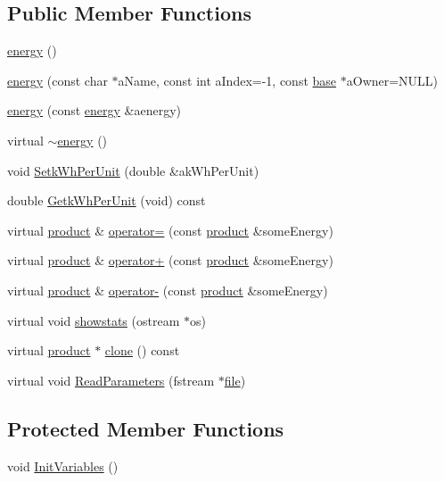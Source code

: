 \subsection*{Public Member Functions}
\begin{DoxyCompactItemize}
\item 
\hyperlink{classenergy_adb9b3923c92c41cba7ac1928d85ed713}{energy} ()
\item 
\hyperlink{classenergy_a86a3f0b749467778796dd2b68fe54b5c}{energy} (const char $\ast$aName, const int aIndex=-\/1, const \hyperlink{classbase}{base} $\ast$aOwner=NULL)
\item 
\hyperlink{classenergy_a2bc4d056b6f3f07f3f3fec1c6240d464}{energy} (const \hyperlink{classenergy}{energy} \&aenergy)
\item 
virtual \hyperlink{classenergy_a96e29d339fe11ddb48d8e17e0d52c0d3}{$\sim$energy} ()
\item 
void \hyperlink{classenergy_a9e9bf5c07d0b8455dcbbd45912533a12}{SetkWhPerUnit} (double \&akWhPerUnit)
\item 
double \hyperlink{classenergy_a61157b46f4f7115eb34238d944a33fe4}{GetkWhPerUnit} (void) const 
\item 
virtual \hyperlink{classproduct}{product} \& \hyperlink{classenergy_aaaba546a4978621479e3e26042463638}{operator=} (const \hyperlink{classproduct}{product} \&someEnergy)
\item 
virtual \hyperlink{classproduct}{product} \& \hyperlink{classenergy_acd0d43ec7777b3f63658b7b1f430e579}{operator+} (const \hyperlink{classproduct}{product} \&someEnergy)
\item 
virtual \hyperlink{classproduct}{product} \& \hyperlink{classenergy_ac3d1fa3eb361e25b316e3cc53c2590e4}{operator-\/} (const \hyperlink{classproduct}{product} \&someEnergy)
\item 
virtual void \hyperlink{classenergy_af421b83f011aca4bc2ee21df490e9326}{showstats} (ostream $\ast$os)
\item 
virtual \hyperlink{classproduct}{product} $\ast$ \hyperlink{classenergy_a42dce7e281e54a333e65e3ca826c90ac}{clone} () const 
\item 
virtual void \hyperlink{classenergy_a96a835d94c0efef55af5279f533c0b77}{ReadParameters} (fstream $\ast$\hyperlink{classbase_a3af52ee9891719d09b8b19b42450b6f6}{file})
\end{DoxyCompactItemize}
\subsection*{Protected Member Functions}
\begin{DoxyCompactItemize}
\item 
void \hyperlink{classenergy_aa993052d14ca60cbce1b89ff2e312d16}{InitVariables} ()
\end{DoxyCompactItemize}
